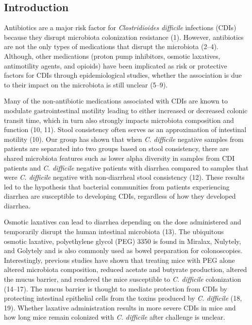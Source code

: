 \documentclass[
  11pt,
]{article}
\begin{document}
\newpage

\hypertarget{introduction}{%
\subsection{Introduction}\label{introduction}}

Antibiotics are a major risk factor for \emph{Clostridioides difficile}
infections (CDIs) because they disrupt microbiota colonization
resistance (1). However, antibiotics are not the only types of
medications that disrupt the microbiota (2--4). Although, other
medications (proton pump inhibitors, osmotic laxatives, antimotility
agents, and opioids) have been implicated as risk or protective factors
for CDIs through epidemiological studies, whether the association is due
to their impact on the microbiota is still unclear (5--9).

Many of the non-antibiotic medications associated with CDIs are known to
modulate gastrointestinal motility leading to either increased or
decreased colonic transit time, which in turn also strongly impacts
microbiota composition and function (10, 11). Stool consistency often
serves as an approximation of intestinal motility (10). Our group has
shown that when \emph{C. difficile} negative samples from patients are
separated into two groups based on stool consistency, there are shared
microbiota features such as lower alpha diversity in samples from CDI
patients and \emph{C. difficile} negative patients with diarrhea
compared to samples that were \emph{C. difficile} negative with
non-diarrheal stool consistency (12). These results led to the
hypothesis that bacterial communities from patients experiencing
diarrhea are susceptible to developing CDIs, regardless of how they
developed diarrhea.

Osmotic laxatives can lead to diarrhea depending on the dose
administered and temporarily disrupt the human intestinal microbiota
(13). The ubiquitous osmotic laxative, polyethylene glycol (PEG) 3350 is
found in Miralax, Nulytely, and Golytely and is also commonly used as
bowel preparation for colonoscopies. Interestingly, previous studies
have shown that treating mice with PEG alone altered microbiota
composition, reduced acetate and butyrate production, altered the mucus
barrier, and rendered the mice susceptible to \emph{C. difficile}
colonization (14--17). The mucus barrier is thought to mediate
protection from CDIs by protecting intestinal epithelial cells from the
toxins produced by \emph{C. difficile} (18, 19). Whether laxative
administration results in more severe CDIs in mice and how long mice
remain colonized with \emph{C. difficile} after challenge is unclear.
\end{document}
